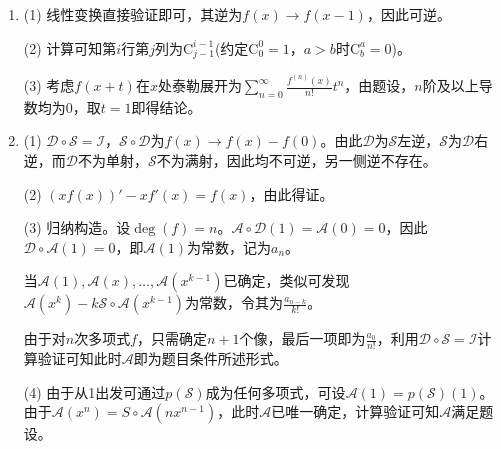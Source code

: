 \documentclass[a4paper,UTF8,fontset=windows]{ctexart}
\begin{document}
\begin{enumerate}
(2) 单射推可逆：考虑$V$的一组基。若这组基的像线性相关，则存在某个非零元素的像为$\mathbf{0}$，与单射矛盾。由8.3节定理8.10,8.11可知这组基的像亦为空间的一组基，由此即知可逆。

满射推可逆：考虑$V$的一组基。若这组基的像线性相关，则像空间的维数低于$V$的维数，与满射矛盾。由8.3节定理8.10,8.11可知这组基的像亦为空间的一组基，由此即知可逆。

(3) 未必成立。

考虑例9.1中的微分变换，若其存在化零多项式，则意味着$\forall f,a_nf^{(n)}+\dots+a_1f'+a_0f=0$，$a_i$不全为0。取次数超过$n$的多项式，考虑最高次项即矛盾。

微分变换为满射，但不可逆；$f(x)\to xf(x)$为单射，但不可逆。

\item
(1) 线性变换直接验证即可，其逆为$f(x)\to f(x-1)$，因此可逆。

(2) 计算可知第$i$行第$j$列为$\mathrm{C}_{j-1}^{i-1}$(约定$\mathrm{C}_0^0=1$，$a>b$时$\mathrm{C}_b^a=0$)。

(3) 考虑$f(x+t)$在$x$处泰勒展开为$\sum_{n=0}^\infty\frac{f^{(n)}(x)}{n!}t^n$，由题设，$n$阶及以上导数均为0，取$t=1$即得结论。

\item
(1) $\mathcal{D}\circ\mathcal{S}=\mathcal{I}$，$\mathcal{S}\circ\mathcal{D}$为$f(x)\to f(x)-f(0)$。由此$\mathcal{D}$为$\mathcal{S}$左逆，$\mathcal{S}$为$\mathcal{D}$右逆，而$\mathcal{D}$不为单射，$\mathcal{S}$不为满射，因此均不可逆，另一侧逆不存在。

(2) $(xf(x))'-xf'(x)=f(x)$，由此得证。

(3) 归纳构造。设$\deg(f)=n$。$\mathcal{A}\circ\mathcal{D}(1)=\mathcal{A}(0)=0$，因此$\mathcal{D}\circ\mathcal{A}(1)=0$，即$\mathcal{A}(1)$为常数，记为$a_n$。

当$\mathcal{A}(1),\mathcal{A}(x),\dots,\mathcal{A}(x^{k-1})$已确定，类似可发现$\mathcal{A}(x^k)-k\mathcal{S}\circ\mathcal{A}(x^{k-1})$为常数，令其为$\frac{a_{n-k}}{k!}$。

由于对$n$次多项式$f$，只需确定$n+1$个像，最后一项即为$\frac{a_0}{n!}$，利用$\mathcal{D}\circ\mathcal{S}=\mathcal{I}$计算验证可知此时$\mathcal{A}$即为题目条件所述形式。

(4) 由于从1出发可通过$p(\mathcal{S})$成为任何多项式，可设$\mathcal{A}(1)=p(\mathcal{S})(1)$。由于$\mathcal{A}(x^n)=S\circ\mathcal{A}(nx^{n-1})$，此时$\mathcal{A}$已唯一确定，计算验证可知$\mathcal{A}$满足题设。
\end{enumerate}
\end{document}
